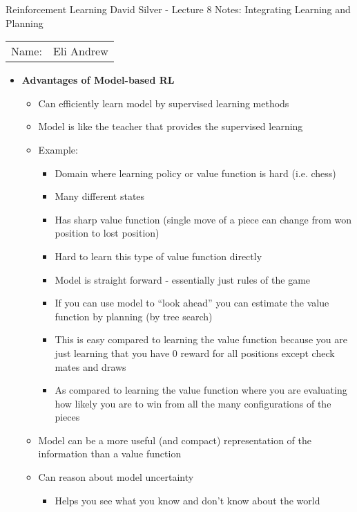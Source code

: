 \documentclass[12pt]{article}
\begin{document}
\begin{center}
{\Large Reinforcement Learning David Silver - Lecture 8 Notes: Integrating Learning and Planning}

\begin{tabular}{rl}
Name: & Eli Andrew
\end{tabular}
\end{center}

  \begin{itemize}
    \item \textbf{Advantages of Model-based RL}
    \begin{itemize}
      \item Can efficiently learn model by supervised learning methods
      \item Model is like the teacher that provides the supervised learning
      \item Example:
      \begin{itemize}
        \item Domain where learning policy or value function is hard (i.e. chess)
        \item Many different states
        \item Has sharp value function (single move of a piece can change from won position
        to lost position)
        \item Hard to learn this type of value function directly
        \item Model is straight forward - essentially just rules of the game
        \item If you can use model to ``look ahead'' you can estimate the value function
        by planning (by tree search)
        \item This is easy compared to learning the value function because you are just learning
        that you have 0 reward for all positions except check mates and draws
        \item As compared to learning the value function where you are evaluating how likely you are to win
        from all the many configurations of the pieces
      \end{itemize}
      \item Model can be a more useful (and compact) representation of the information
      than a value function
      \item Can reason about model uncertainty
      \begin{itemize}
        \item Helps you see what you know and don't know about the world

\end{itemize}
\end{itemize}
\end{itemize}
\end{document}
